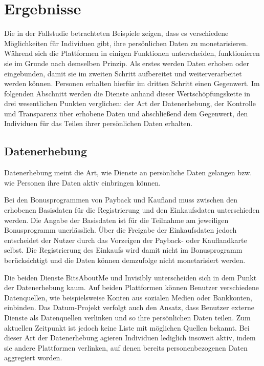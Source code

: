 \section{Ergebnisse}
Die in der Fallstudie betrachteten Beispiele zeigen, dass es verschiedene Möglichkeiten für Individuen gibt, ihre persönlichen Daten zu monetarisieren. Während sich die Plattformen in einigen Funktionen unterscheiden, funktionieren sie im Grunde nach demselben Prinzip. Als erstes werden Daten erhoben oder eingebunden, damit sie im zweiten Schritt aufbereitet und weiterverarbeitet werden können. Personen erhalten hierfür im dritten Schritt einen Gegenwert. Im folgenden Abschnitt werden die Dienste anhand dieser Wertschöpfungskette in drei wesentlichen Punkten verglichen: der Art der Datenerhebung, der Kontrolle und Transparenz über erhobene Daten und abschließend dem Gegenwert, den Individuen für das Teilen ihrer persönlichen Daten erhalten.

\subsection{Datenerhebung}
Datenerhebung meint die Art, wie Dienste an persönliche Daten gelangen bzw. wie Personen ihre Daten aktiv einbringen können. \newline

\noindent Bei den Bonusprogrammen von Payback und Kaufland muss zwischen den erhobenen Basisdaten für die Registrierung und den Einkaufsdaten unterschieden werden. Die Angabe der Basisdaten ist für die Teilnahme am jeweiligen Bonusprogramm unerlässlich. Über die Freigabe der Einkaufsdaten jedoch entscheidet der Nutzer durch das Vorzeigen der Payback- oder Kauflandkarte selbst. Die Registrierung des Einkaufs wird damit nicht im Bonusprogramm berücksichtigt und die Daten können demzufolge nicht monetarisiert werden. \newline

\noindent Die beiden Dienste BitsAboutMe und Invisibly unterscheiden sich in dem Punkt der Datenerhebung kaum. Auf beiden Plattformen können Benutzer verschiedene Datenquellen, wie beispielsweise Konten aus sozialen Medien oder Bankkonten, einbinden. Das Datum-Projekt verfolgt auch den Ansatz, dass Benutzer externe Dienste als Datenquellen verlinken und so ihre persönlichen Daten teilen. Zum aktuellen Zeitpunkt ist jedoch keine Liste mit möglichen Quellen bekannt. Bei dieser Art der Datenerhebung agieren Individuen lediglich insoweit aktiv, indem sie andere Plattformen verlinken, auf denen bereits personenbezogenen Daten aggregiert worden. \newline

